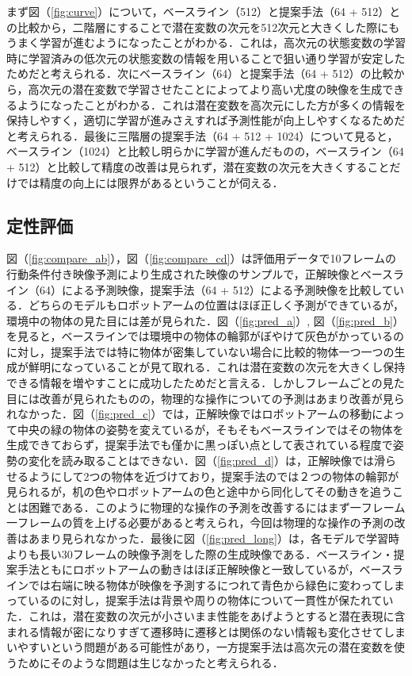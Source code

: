 まず図（\ref{fig:curve}）について，ベースライン（512）と提案手法（64 + 512）との比較から，二階層にすることで潜在変数の次元を512次元と大きくした際にもうまく学習が進むようになったことがわかる．これは，高次元の状態変数の学習時に学習済みの低次元の状態変数の情報を用いることで狙い通り学習が安定したためだと考えられる．次にベースライン（64）と提案手法（64 + 512）の比較から，高次元の潜在変数で学習させたことによってより高い尤度の映像を生成できるようになったことがわかる．これは潜在変数を高次元にした方が多くの情報を保持しやすく，適切に学習が進みさえすれば予測性能が向上しやすくなるためだと考えられる．最後に三階層の提案手法（64 + 512 + 1024）について見ると，ベースライン（1024）と比較し明らかに学習が進んだものの，ベースライン（64 + 512）と比較して精度の改善は見られず，潜在変数の次元を大きくすることだけでは精度の向上には限界があるということが伺える．

\subsection{定性評価}
図（\ref{fig:compare_ab}），図（\ref{fig:compare_cd}）は評価用データで10フレームの行動条件付き映像予測により生成された映像のサンプルで，正解映像とベースライン（64）による予測映像，提案手法（64 + 512）による予測映像を比較している．どちらのモデルもロボットアームの位置はほぼ正しく予測ができているが，環境中の物体の見た目には差が見られた．図（\ref{fig:pred_a}）, 図（\ref{fig:pred_b}）を見ると，ベースラインでは環境中の物体の輪郭がぼやけて灰色がかっているのに対し，提案手法では特に物体が密集していない場合に比較的物体一つ一つの生成が鮮明になっていることが見て取れる．これは潜在変数の次元を大きくし保持できる情報を増やすことに成功したためだと言える．しかしフレームごとの見た目には改善が見られたものの，物理的な操作についての予測はあまり改善が見られなかった．図（\ref{fig:pred_c}）では，正解映像ではロボットアームの移動によって中央の緑の物体の姿勢を変えているが，そもそもベースラインではその物体を生成できておらず，提案手法でも僅かに黒っぽい点として表されている程度で姿勢の変化を読み取ることはできない．図（\ref{fig:pred_d}）は，正解映像では滑らせるようにして2つの物体を近づけており，提案手法のでは２つの物体の輪郭が見られるが，机の色やロボットアームの色と途中から同化してその動きを追うことは困難である．このように物理的な操作の予測を改善するにはまず一フレーム一フレームの質を上げる必要があると考えられ，今回は物理的な操作の予測の改善はあまり見られなかった．最後に図（\ref{fig:pred_long}）は，各モデルで学習時よりも長い30フレームの映像予測をした際の生成映像である．ベースライン・提案手法ともにロボットアームの動きはほぼ正解映像と一致しているが，ベースラインでは右端に映る物体が映像を予測するにつれて青色から緑色に変わってしまっているのに対し，提案手法は背景や周りの物体について一貫性が保たれていた．これは，潜在変数の次元が小さいまま性能をあげようとすると潜在表現に含まれる情報が密になりすぎて遷移時に遷移とは関係のない情報も変化させてしまいやすいという問題がある可能性があり，一方提案手法は高次元の潜在変数を使うためにそのような問題は生じなかったと考えられる．

